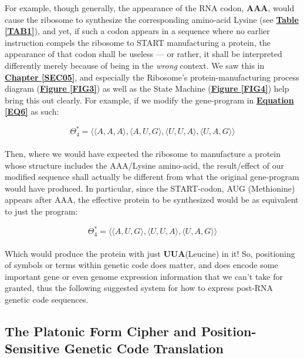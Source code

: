 \documentclass[a4paper, 18pt]{book} %
\begin{document}
For example, though generally, the appearance of the RNA codon, \textbf{AAA}, would cause the ribosome to synthesize the corresponding amino-acid Lysine (see \textbf{\hyperref[TAB1]{Table \ref{TAB1}}}), and yet, if such a codon appears in a sequence where no earlier instruction compels the ribosome to START manufacturing a protein, the appearance of that codon shall be useless --- or rather, it shall be interpreted differently merely because of being in the \textit{wrong} context. We saw this in \textbf{\hyperref[SEC05]{Chapter \ref{SEC05}}}, and especially the Ribosome's protein-manufacturing process diagram (\textbf{\hyperref[FIG3]{Figure \ref{FIG3}}}) as well as the State Machine (\textbf{\hyperref[FIG4]{Figure \ref{FIG4}}}) help bring this out clearly. For example, if we modify the gene-program  in \textbf{\hyperref[EQ6]{Equation \ref{EQ6}}} as such:


 \begin{equation}
\label{EQ6B}
\Theta_4^* = \langle \langle A, A, A \rangle, \langle A, U, G \rangle, \langle U, U, A \rangle, \langle U, A, G \rangle \rangle
\end{equation}\\


Then, where we would have expected the ribosome to manufacture a protein whose structure includes the AAA/Lysine amino-acid, the result/effect of our modified sequence shall actually be different from what the original gene-program would have produced. In particular, since the START-codon, AUG (Methionine) appears after AAA, the effective protein to be synthesized would be as equivalent to just the program:

 \begin{equation}
\label{EQ6C}
\Theta_4^* = \langle \langle A, U, G \rangle, \langle U, U, A \rangle, \langle U, A, G \rangle \rangle
\end{equation}\\

Which would produce the protein with just \textbf{UUA}(Leucine) in it! So, positioning of symbols or terms within genetic code does matter, and does encode some important gene or even genome expression information that we can't take for granted, thus the following suggested system for how to express post-RNA genetic code sequences.

\subsection{The Platonic Form Cipher and Position-Sensitive Genetic Code Translation}
\label{SECPLATONIC}
\end{document}
